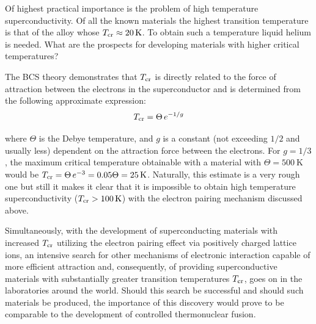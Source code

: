 Of highest practical importance is the problem of high temperature superconductivity. Of all the known materials the highest transition temperature is that of the alloy  whose $T_{\text{cr}}\approx\SI{20}{\kelvin}$. To obtain such a temperature liquid helium is needed. What are the prospects for developing materials with higher critical temperatures?

The BCS theory demonstrates that $T_{\text{cr}}$ is directly related to the force of attraction between the electrons in the superconductor and is determined from the following approximate expression:
\begin{equation}\label{eq:6_61}
	T_{\text{cr}} = \Theta\, e^{-1/g}
\end{equation}

\noindent
where $\Theta$ is the Debye temperature, and $g$ is a constant (not exceeding $1/2$ and usually less) dependent on the attraction force between the electrons. For $g=1/3$, the maximum critical temperature obtainable with a material with $\Theta=\SI{500}{\kelvin}$ would be $T_{\text{cr}}=\Theta\,e^{-3}=0.05\Theta=\SI{25}{\kelvin}$. Naturally, this estimate is a very rough one but still it makes it clear that it is impossible to obtain high temperature superconductivity ($T_{\text{cr}}>\SI{100}{\kelvin}$) with the electron pairing mechanism discussed above.

Simultaneously, with the development of superconducting materials with increased $T_{\text{cr}}$ utilizing the electron pairing effect via positively charged lattice ions, an intensive search for other mechanisms of electronic interaction capable of more efficient attraction and, consequently, of providing superconductive materials with substantially greater transition temperatures $T_{\text{cr}}$, goes on in the laboratories around the world. Should this search be successful and should such materials be produced, the importance of this discovery would prove to be comparable to the development of controlled thermonuclear fusion.
